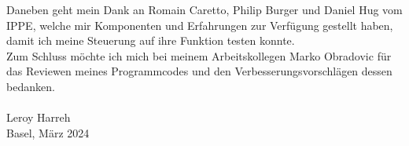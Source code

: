 Daneben geht mein Dank an Romain Caretto, Philip Burger und Daniel Hug vom IPPE, welche mir Komponenten und Erfahrungen zur Verfügung gestellt haben, damit ich meine Steuerung auf ihre Funktion testen konnte.\\

Zum Schluss möchte ich mich bei meinem Arbeitskollegen Marko Obradovic für das Reviewen meines Programmcodes und den Verbesserungsvorschlägen dessen bedanken.
\\\\
Leroy Harreh\\
Basel, März 2024

